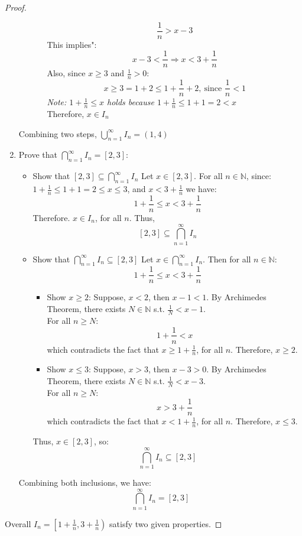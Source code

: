 \documentclass{article}
\begin{document}
\begin{proof}
\begin{enumerate}
\begin{itemize}
\begin{itemize}
            \[ \frac{1}{n} > x - 3 \]
            This implies":
            \[ x - 3 < \frac{1}{n} \Rightarrow x < 3 + \frac{1}{n} \]
            Also, since $x \geq 3$ and $\frac{1}{n} > 0$:
            \[ x \geq 3 = 1 + 2 \leq 1 + \frac{1}{n} + 2, \ \text{since } \frac{1}{n} < 1 \]
            \textit{Note: $1 + \frac{1}{n} \leq x$ holds because $1 + \frac{1}{n} \leq 1 + 1 = 2 < x$}
            \\
            Therefore, $x \in I_n$
        \end{itemize}
    \end{itemize}
    Combining two steps, \( \bigcup_{n=1}^{\infty} I_n = (1, 4) \)

    \item Prove that \( \bigcap_{n=1}^{\infty} I_n = [2, 3] \):
    \begin{itemize}
        \item Show that $[2, 3] \subseteq \bigcap_{n=1}^{\infty} I_n$
        Let $x \in [2, 3]$. For all $n \in \mathbb{N}$, since:
        \( 1 + \frac{1}{n} \leq 1 + 1 = 2 \leq x \leq 3 \), and \( x < 3 + \frac{1}{n} \)
        we have:
        \[ 1 + \frac{1}{n} \leq x < 3 + \frac{1}{n} \]
        Therefore. $x \in I_n$, for all $n$. Thus,
        \[ [2, 3] \subseteq \bigcap_{n=1}^{\infty} I_n \]
        \item Show that $ \bigcap_{n=1}^{\infty} I_n \subseteq [2, 3] $
        Let $x \in \bigcap_{n=1}^{\infty} I_n$. Then for all $n \in \mathbb{N}$:
        \[ 1 + \frac{1}{n} \leq x < 3 + \frac{1}{n} \]
        \begin{itemize}
            \item Show $x \geq 2$:
            Suppose, $x < 2$, then $x - 1 < 1$. By Archimedes Theorem, there exists $N \in \mathbb{N}$ s.t. $\frac{1}{N} < x - 1$.
            \\
            For all $n \geq N$:
            \[ 1 + \frac{1}{n} < x \]
            which contradicts the fact that $x \geq 1 + \frac{1}{n}$, for all $n$. Therefore, $x \geq 2$.
            \item Show $x \leq 3$:
            Suppose, $x > 3$, then $x - 3 > 0$. By Archimedes Theorem, there exists $N \in \mathbb{N}$ s.t. $\frac{1}{N} < x - 3$.
            \\
            For all $n \geq N$:
            \[ x > 3 + \frac{1}{n} \]
            which contradicts the fact that $x < 1 + \frac{1}{n}$, for all $n$. Therefore, $x \leq 3$.
        \end{itemize}
        Thus, $x \in [2, 3]$, so:
        \[ \bigcap_{n=1}^{\infty} I_n \subseteq [2, 3] \]
    \end{itemize}
    Combining both inclusions, we have:
    \[ \bigcap_{n=1}^{\infty} I_n = [2, 3] \]
\end{enumerate}
Overall \( I_n = \left[ 1 + \frac{1}{n}, 3 + \frac{1}{n} \right) \) satisfy two given properties.

\end{proof}
\end{document}
